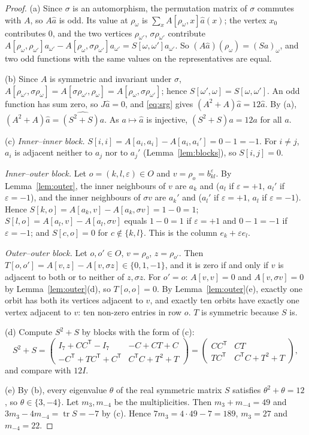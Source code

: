 \documentclass[11pt,a4paper]{article}
\theoremstyle{definition}
\theoremstyle{remark}
\newcommand{\tp}{\mathsf{T}}
\newcommand{\sg}{\sigma}
\newcommand{\tr}{\operatorname{tr}}
\begin{document}
\begin{proof}
(a) Since $\sg$ is an automorphism, the permutation matrix of $\sg$ commutes with $A$, so $A\hat a$ is odd. Its
value at $\rho_\omega$ is $\sum_xA[\rho_\omega,x]\hat a(x)$; the vertex $x_0$ contributes $0$, and the two vertices
$\rho_{\omega'}$, $\sg\rho_{\omega'}$ contribute
$A[\rho_\omega,\rho_{\omega'}]a_{\omega'}-A[\rho_\omega,\sg\rho_{\omega'}]a_{\omega'}=S[\omega,\omega']a_{\omega'}$.
So $(A\hat a)(\rho_\omega)=(Sa)_\omega$, and two odd functions with the same values on the representatives are equal.

(b) Since $A$ is symmetric and invariant under $\sg$,
$A[\rho_{\omega'},\sg\rho_\omega]=A[\sg\rho_{\omega'},\rho_\omega]=A[\rho_\omega,\sg\rho_{\omega'}]$; hence
$S[\omega',\omega]=S[\omega,\omega']$. An odd function has sum zero, so $J\hat a=0$, and \eqref{eq:srg} gives
$(A^2+A)\hat a=12\hat a$. By (a), $(A^2+A)\hat a=\widehat{(S^2+S)a}$. As $a\mapsto\hat a$ is injective,
$(S^2+S)a=12a$ for all $a$.

(c) \emph{Inner--inner block.} $S[i,i]=A[a_i,a_i]-A[a_i,a_i']=0-1=-1$. For $i\ne j$, $a_i$ is adjacent neither to
$a_j$ nor to $a_j'$ (Lemma~\ref{lem:blocks}), so $S[i,j]=0$.

\emph{Inner--outer block.} Let $o=(k,l,\varepsilon)\in O$ and $v=\rho_o=b_{kl}^{\varepsilon}$. By
Lemma~\ref{lem:outer}, the inner neighbours of $v$ are $a_k$ and ($a_l$ if $\varepsilon=+1$, $a_l'$ if
$\varepsilon=-1$), and the inner neighbours of $\sg v$ are $a_k'$ and ($a_l'$ if $\varepsilon=+1$, $a_l$ if
$\varepsilon=-1$). Hence $S[k,o]=A[a_k,v]-A[a_k,\sg v]=1-0=1$; $S[l,o]=A[a_l,v]-A[a_l,\sg v]$ equals $1-0=1$ if
$\varepsilon=+1$ and $0-1=-1$ if $\varepsilon=-1$; and $S[c,o]=0$ for $c\notin\{k,l\}$. This is the column
$e_k+\varepsilon e_l$.

\emph{Outer--outer block.} Let $o,o'\in O$, $v=\rho_o$, $z=\rho_{o'}$. Then
$T[o,o']=A[v,z]-A[v,\sg z]\in\{0,1,-1\}$, and it is zero if and only if $v$ is adjacent to both or to neither of
$z,\sg z$. For $o'=o$: $A[v,v]=0$ and $A[v,\sg v]=0$ by Lemma~\ref{lem:outer}(d), so $T[o,o]=0$. By
Lemma~\ref{lem:outer}(e), exactly one orbit has both its vertices adjacent to $v$, and exactly ten orbits have
exactly one vertex adjacent to $v$: ten non-zero entries in row $o$. $T$ is symmetric because $S$ is.

(d) Compute $S^2+S$ by blocks with the form of (c):
\[
S^2+S=\begin{pmatrix}I_7+CC^{\tp}-I_7&-C+CT+C\\ -C^{\tp}+TC^{\tp}+C^{\tp}&C^{\tp}C+T^2+T\end{pmatrix}
=\begin{pmatrix}CC^{\tp}&CT\\ TC^{\tp}&C^{\tp}C+T^2+T\end{pmatrix},
\]
and compare with $12I$.

(e) By (b), every eigenvalue $\theta$ of the real symmetric matrix $S$ satisfies $\theta^2+\theta=12$, so
$\theta\in\{3,-4\}$. Let $m_3,m_{-4}$ be the multiplicities. Then $m_3+m_{-4}=49$ and
$3m_3-4m_{-4}=\tr S=-7$ by (c). Hence $7m_3=4\cdot49-7=189$, $m_3=27$ and $m_{-4}=22$.
\end{proof}
\end{document}
